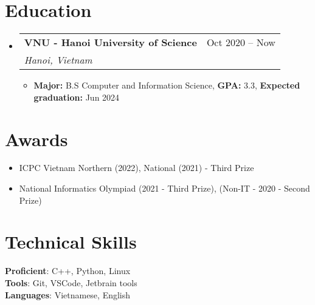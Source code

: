 \documentclass[letterpaper,11pt]{article}
\makeatletter
\newcommand{\resumeItem}[1]{
  \item{
    {#1 \vspace{-1.5pt}}
  }
}
\newcommand{\resumeSubheading}[4]{
  \vspace{-2pt}\item
    \begin{tabular*}{0.97\textwidth}[t]{l@{\extracolsep{\fill}}l}
      \textbf{#1} & #2 \\
      \textit{\small#3} & \textit{\small #4} \\
    \end{tabular*}\vspace{-8pt}
}
\newcommand{\resumeSubHeadingListStart}{\begin{itemize}[leftmargin=0.1in, label={}]}
\newcommand{\resumeSubHeadingListEnd}{\end{itemize}}
\newcommand{\resumeItemListStart}{\begin{itemize}[leftmargin=0.2in]}
\newcommand{\resumeItemListEnd}{\end{itemize}\vspace{-2pt}}
\makeatother
\begin{document}
\section{Education}
  \resumeSubHeadingListStart
    \resumeSubheading
      {VNU - Hanoi University of Science}{Oct 2020 – Now}
      {Hanoi, Vietnam}{}
          \resumeItemListStart
            \resumeItem{\textbf{Major:} B.S Computer and Information Science, \textbf{GPA:} 3.3, \textbf{Expected graduation:} Jun 2024}
        \resumeItemListEnd

  \resumeSubHeadingListEnd


      
    


\section{Awards}

    \begin{itemize}
        \item ICPC Vietnam Northern (2022), National (2021) - Third Prize
        \item National Informatics Olympiad (2021 - Third Prize), (Non-IT - 2020 - Second Prize)
    \end{itemize}


%
\section{Technical Skills}
 \begin{itemize}[leftmargin=0.15in, label={}]
    \small{\item{
     \textbf{Proficient}{: C++, Python, Linux} \\
     \textbf{Tools}{: Git, VSCode, Jetbrain tools} \\
     \textbf{Languages}{: Vietnamese, English} \\
    }}
 \end{itemize}

\end{document}
